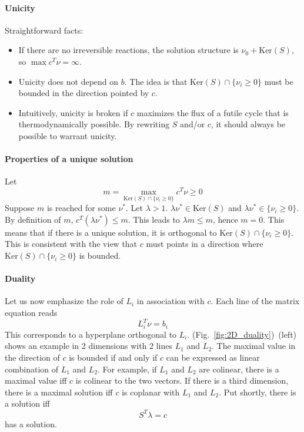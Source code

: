 \documentclass[12pt]{scrartcl}
\newcommand\refp[3][]{(#2~\ref{#3}#1)}
\theoremstyle{definition}
\theoremstyle{remark}
\numberwithin{equation}{section}
\newcommand{\Ker}[1]{\mathrm{Ker}\left(#1\right)}
\newcommand\reffigp[2][]{\refp[#1]{Fig.}{#2}}
\begin{document}
\paragraph{Unicity} Straightforward facts:
\begin{itemize}
  \item If there are no irreversible reactions, the solution structure is $\nu_0 + \Ker{S}$, so $\max c^T\nu = \infty$.
  \item Unicity does not depend on $b$. The idea is that $\Ker{S} \cap \{\nu_i \geq 0\}$ must be bounded in the direction pointed by $c$.
  \item Intuitively, unicity is broken if $c$ maximizes the flux of a futile cycle that is thermodynamically possible. By rewriting $S$ and/or $c$, it should always be possible to warrant unicity.
\end{itemize}

\paragraph{Properties of a unique solution} Let
\[
m = \max_{\Ker{S} \cap \{ \nu_i \geq 0 \}} c^T \nu \geq 0
\]
Suppose $m$ is reached for some $\nu^*$. Let $\lambda > 1$. $\lambda \nu^* \in \Ker{S}$ and $\lambda \nu^* \in \{\nu_i \geq 0\}$. By definition of $m$, $c^T(\lambda \nu^*) \leq m$. This leads to $\lambda m \leq m$, hence $m = 0$. This means that if there is a unique solution, it is orthogonal to $\Ker{S} \cap \{ \nu_i \geq 0 \}$. This is consistent with the view that $c$ must points in a direction where $\Ker{S} \cap \{ \nu_i \geq 0 \}$ is bounded.

\paragraph{Duality} Let us now emphasize the role of $L_i$ in association with $c$. Each line of the matrix equation reads
\[
L_i^T \nu = b_i
\]
This corresponds to a hyperplane orthogonal to $L_i$. \reffigp{fig:2D_duality}~(left) shows an example in 2 dimensions with 2 lines $L_1$ and $L_2$. The maximal value in the direction of $c$ is bounded if and only if $c$ can be expressed as linear combination of $L_1$ and $L_2$. For example, if $L_1$ and $L_2$ are colinear, there is a maximal value iff $c$ is colinear to the two vectors. If there is a third dimension, there is a maximal solution iff $c$ is coplanar with $L_1$ and $L_2$. Put shortly, there is a solution iff
\[
S^T\lambda = c
\]
has a solution.
\end{document}
